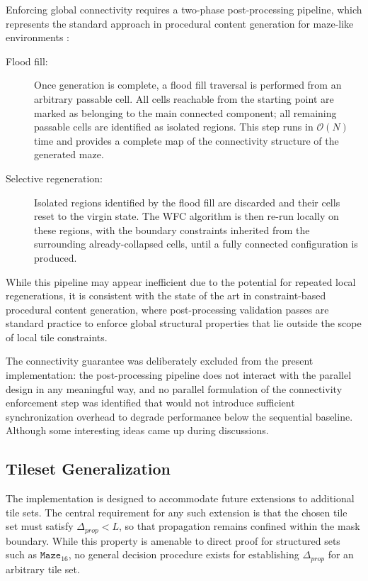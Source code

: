 Enforcing global connectivity requires a two-phase post-processing pipeline,
which represents the standard approach in procedural content generation for
maze-like environments \cite{atlantis2018pcg}:

\begin{description}
    \item[Flood fill:] Once generation is complete, a flood fill traversal is
    performed from an arbitrary passable cell. All cells reachable from the
    starting point are marked as belonging to the main connected component;
    all remaining passable cells are identified as isolated regions. This step
    runs in $\mathcal{O}(N)$ time and provides a complete map of the
    connectivity structure of the generated maze.

    \item[Selective regeneration:] Isolated regions identified by the flood
    fill are discarded and their cells reset to the virgin state. The WFC
    algorithm is then re-run locally on these regions, with the boundary
    constraints inherited from the surrounding already-collapsed cells, until
    a fully connected configuration is produced.
\end{description}

While this pipeline may appear inefficient due to the potential for repeated
local regenerations, it is consistent with the state of the art in
constraint-based procedural content generation, where post-processing
validation passes are standard practice to enforce global structural
properties that lie outside the scope of local tile
constraints.

The connectivity guarantee was deliberately excluded from the present
implementation: the post-processing pipeline does not interact with the
parallel design in any meaningful way, and no parallel formulation of the
connectivity enforcement step was identified that would not introduce
sufficient synchronization overhead to degrade performance below the
sequential baseline. Although some interesting ideas came up during discussions.

\subsection{Tileset Generalization}
The implementation is designed to accommodate future extensions to additional 
tile sets. The central requirement for any such extension is that the chosen 
tile set must satisfy $\Delta_{prop} < L$, so that propagation remains confined 
within the mask boundary. While this property is amenable to direct proof for 
structured sets such as $\texttt{Maze}_{16}$, no general decision procedure 
exists for establishing $\Delta_{prop}$ for an arbitrary tile set.

